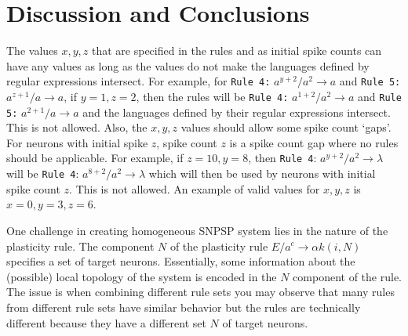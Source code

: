 \documentclass[smallextended]{svjour3}
\begin{document}

\section{Discussion and Conclusions} \label{sec-disc}

The values $x,y,z$ that are specified in the rules and as initial spike counts can have any values as long as the values do not make the languages
defined by regular expressions intersect. For example, for \texttt{Rule 4:} $a^{y+2}/a^2 \rightarrow a$ and \texttt{Rule 5:} $a^{z+1}/a \rightarrow a$, if 
$y=1, z=2$, then the rules will be \texttt{Rule 4:} $a^{1+2}/a^2 \rightarrow a$ and \texttt{Rule 5:} $a^{2+1}/a \rightarrow a$ and the languages
defined by their regular expressions intersect. This is not allowed. Also, the $x,y,z$ values should allow some spike count `gaps'. For neurons
with initial spike $z$, spike count $z$ is a spike count gap where no rules should be applicable. For example, if $z=10, y=8$, then \texttt{Rule 4}: $a^{y+2}/a^2 
\rightarrow \lambda$ will be \texttt{Rule 4}: $a^{8+2}/a^2 \rightarrow \lambda$ which will then be used by neurons with initial spike count $z$. This
is not allowed. An example of valid values for $x,y,z$ is $x=0, y=3, z=6$.

One challenge in creating homogeneous SNPSP system lies in the nature of the plasticity rule. The component $N$ of the plasticity rule $E/a^c 
\rightarrow \alpha k(i,N)$ specifies a set of target neurons. Essentially, some information about the (possible) local topology of the system is 
encoded in the $N$ component of the rule. The issue is when combining different rule sets you may observe that many rules from different rule sets 
have similar behavior but the rules are technically different because they have a different set $N$ of target neurons.
\end{document}

